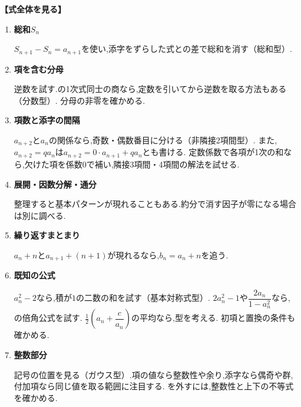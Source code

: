\begingroup
  \medskip
  \noindent \textbf{【式全体を見る】}
  \begin{enumerate}
    \item \textbf{総和$S_n$}

      $S_{n+1}-S_n=a_{n+1}$を使い,添字をずらした式との差で総和を消す（総和型）.

    \item \textbf{項を含む分母}

      逆数を試す.の1次式同士の商なら,定数を引いてから逆数を取る方法もある（分数型）.
      分母の非零を確かめる.

    \item \textbf{項数と添字の間隔}

      $a_{n+2}$と$a_n$の関係なら,奇数・偶数番目に分ける（非隣接2項間型）.
      また,$a_{n+2}=qa_n$は$a_{n+2}=0\cdot a_{n+1}+qa_n$とも書ける.
      定数係数で各項が1次の和なら,欠けた項を係数$0$で補い,隣接3項間・4項間の解法を試せる.

    \item \textbf{展開・因数分解・通分}

      整理すると基本パターンが現れることもある.約分で消す因子が零になる場合は別に調べる.

    \item \textbf{繰り返すまとまり}

      $a_n+n$と$a_{n+1}+(n+1)$が現れるなら,$b_n=a_n+n$を追う.

    \item \textbf{既知の公式}

      $a_n^2-2$なら,積が$1$の二数の和を試す（基本対称式型）.
      $2a_n^2-1$や$\dfrac{2a_n}{1-a_n^2}$なら,の倍角公式を試す.
      $\frac12\left(a_n+\dfrac{c}{a_n}\right)$の平均なら,型を考える.
      初項と置換の条件も確かめる.


    \item \textbf{整数部分}

      記号の位置を見る（ガウス型）.項の値なら整数性や余り,添字なら偶奇や群,付加項なら同じ値を取る範囲に注目する.
      を外すには,整数性と上下の不等式を確かめる.
  \end{enumerate}

